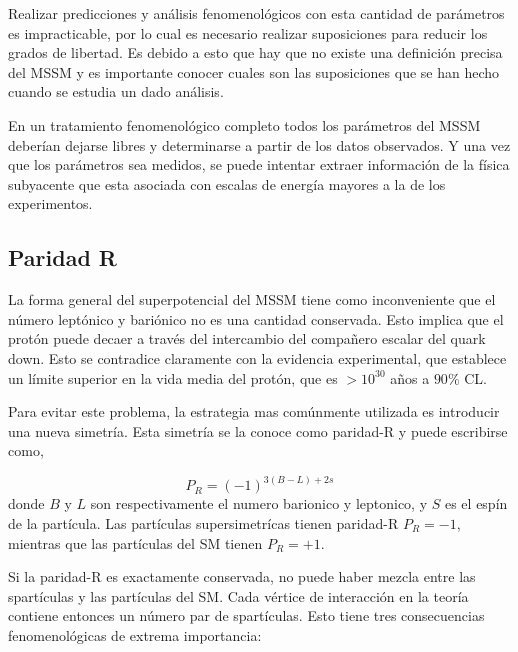 Realizar predicciones y análisis fenomenológicos con esta cantidad de parámetros es
impracticable, por lo cual es necesario realizar suposiciones para
reducir los grados de libertad. Es debido a esto que hay que no existe una definición
precisa del MSSM y es importante conocer cuales son las suposiciones que se han
hecho cuando se estudia un dado análisis.

En un tratamiento fenomenológico completo todos los parámetros del MSSM deberían
dejarse libres y determinarse a partir de los datos observados. Y una vez que los
parámetros sea medidos, se puede intentar extraer información de la física
subyacente que esta asociada con escalas de energía mayores a la de los
experimentos.



\subsection{Paridad R}

La forma general del superpotencial del MSSM tiene como inconveniente que el
número leptónico y bariónico no es una cantidad conservada. Esto implica que el
protón puede decaer a través del intercambio del compañero escalar del quark
down. Esto se contradice claramente con la evidencia experimental, que establece
un límite superior en la vida media del protón, que es $> 10^{30}$ a\~nos a $90\%$ CL\cite{PDG}.

Para evitar este problema, la estrategia mas comúnmente utilizada es introducir
una nueva simetría. Esta simetría se la conoce como paridad-R y puede escribirse
como,

\begin{equation}
  P_R = (-1)^{3(B-L)+ 2s}
\end{equation}
%
donde $B$ y $L$ son respectivamente el numero barionico y leptonico, y $S$ es el
espín de la partícula. Las partículas supersimetrícas tienen paridad-R $P_R = -1$, mientras
que las partículas del SM tienen $P_R = +1$.

Si la paridad-R es exactamente conservada, no puede haber mezcla entre las
spartículas y las partículas del SM. Cada vértice de interacción en la
teoría contiene entonces un número par de spartículas. Esto tiene tres consecuencias
fenomenológicas de extrema importancia:


